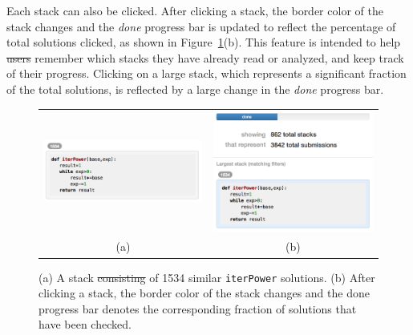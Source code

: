 \documentclass[12pt,twoside]{mitthesis}
\newcommand \codevar[1]{\texttt{#1}}
\providecommand{\DIFaddtex}[1]{{\protect\color{blue}\uwave{#1}}} %
\providecommand{\DIFdeltex}[1]{{\protect\color{red}\sout{#1}}}                      %
\providecommand{\DIFaddbegin}{} %
\providecommand{\DIFaddend}{} %
\providecommand{\DIFdelbegin}{} %
\providecommand{\DIFdelend}{} %
\providecommand{\DIFdelFL}[1]{\DIFdel{#1}} %
\providecommand{\DIFdelbeginFL}{} %
\providecommand{\DIFdelendFL}{} %
\providecommand{\DIFadd}[1]{\texorpdfstring{\DIFaddtex{#1}}{#1}} %
\providecommand{\DIFdel}[1]{\texorpdfstring{\DIFdeltex{#1}}{}} %
\begin{document}
Each stack can also be clicked. After clicking a stack, the border color of the stack changes and the \emph{done} progress bar is updated to reflect the percentage of total solutions clicked, as shown in Figure~\ref{stacks}(b). This feature is intended to help \DIFdelbegin \DIFdel{users }\DIFdelend \DIFaddbegin \DIFadd{teachers }\DIFaddend remember which stacks they have already read or analyzed, and keep track of their progress. Clicking on a large stack, which represents a significant fraction of the total solutions, is reflected by a large change in the \emph{done} progress bar. 

\begin{figure}[htpb]
\begin{tabular}{c | c}
\begin{minipage}{.5\linewidth}
\centering
\includegraphics[width=0.95\linewidth]{Body/figures/overcode/stackScreenShot.png}
\end{minipage}
&
\begin{minipage}{.5\linewidth}
\centering
\includegraphics[width=0.95\linewidth]{Body/figures/overcode/checkDone.png}
\end{minipage}
\\
(a) & (b)
\end{tabular}
\caption{(a) A stack \DIFdelbeginFL \DIFdelFL{consisting }\DIFdelendFL of 1534 similar \codevar{iterPower} solutions. (b) After clicking a stack, the border color of the stack changes and the done progress bar denotes the corresponding fraction of solutions that have been checked.}
\label{stacks}
\end{figure}
\end{document}
